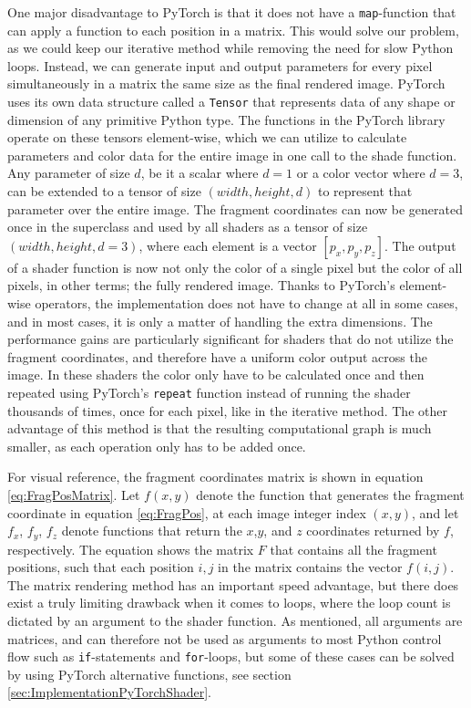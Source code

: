 One major disadvantage to PyTorch is that it does not have a \texttt{map}-function that can apply a function to each position in a matrix. This would solve our problem, as we could keep our iterative method while removing the need for slow Python loops. Instead, we can generate input and output parameters for every pixel simultaneously in a matrix the same size as the final rendered image. PyTorch uses its own data structure called a \texttt{Tensor} that represents data of any shape or dimension of any primitive Python type. The functions in the PyTorch library operate on these tensors element-wise, which we can utilize to calculate parameters and color data for the entire image in one call to the shade function. Any parameter of size $d$, be it a scalar where $d=1$ or a color vector where $d=3$, can be extended to a tensor of size $(width, height, d)$ to represent that parameter over the entire image. The fragment coordinates can now be generated once in the superclass and used by all shaders as a tensor of size $(width, height, d=3)$, where each element is a vector $[p_x,  p_y,  p_z]$. The output of a shader function is now not only the color of a single pixel but the color of all pixels, in other terms; the fully rendered image. Thanks to PyTorch's element-wise operators, the implementation does not have to change at all in some cases, and in most cases, it is only a matter of handling the extra dimensions. The performance gains are particularly significant for shaders that do not utilize the fragment coordinates, and therefore have a uniform color output across the image. In these shaders the color only have to be calculated once and then repeated using PyTorch's \texttt{repeat} function instead of running the shader thousands of times, once for each pixel, like in the iterative method. The other advantage of this method is that the resulting computational graph is much smaller, as each operation only has to be added once.


For visual reference, the fragment coordinates matrix is shown in equation \ref{eq:FragPosMatrix}. Let $f(x,y)$ denote the function that generates the fragment coordinate in equation \ref{eq:FragPos}, at each image integer index $(x,y)$, and let $f_x$, $f_y$, $f_z$ denote functions that return the $x$,$y$, and $z$ coordinates returned by $f$, respectively. The equation shows the matrix $F$ that contains all the fragment positions, such that each position $i,j$ in the matrix contains the vector $f(i,j)$. 
The matrix rendering method has an important speed advantage, but there does exist a truly limiting drawback when it comes to loops, where the loop count is dictated by an argument to the shader function. As mentioned, all arguments are matrices, and can therefore not be used as arguments to most Python control flow such as \texttt{if}-statements and \texttt{for}-loops, but some of these cases can be solved by using PyTorch alternative functions, see section \ref{sec:ImplementationPyTorchShader}.

